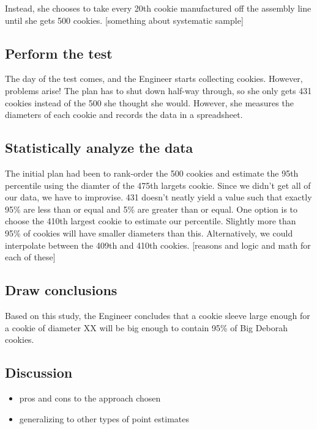 \documentclass[]{book}
\providecommand{\tightlist}{%
  \setlength{\itemsep}{0pt}\setlength{\parskip}{0pt}}
\theoremstyle{definition}
\theoremstyle{definition}
\theoremstyle{definition}
\theoremstyle{remark}
\begin{document}
Instead, she chooses to take every 20th cookie manufactured off the
assembly line until she gets 500 cookies. {[}something about systematic
sample{]}

\subsection{Perform the test}\label{perform-the-test}

The day of the test comes, and the Engineer starts collecting cookies.
However, problems arise! The plan has to shut down half-way through, so
she only gets 431 cookies instead of the 500 she thought she would.
However, she measures the diameters of each cookie and records the data
in a spreadsheet.

\subsection{Statistically analyze the
data}\label{statistically-analyze-the-data-2}

The initial plan had been to rank-order the 500 cookies and estimate the
95th percentile using the diamter of the 475th largets cookie. Since we
didn't get all of our data, we have to improvise. 431 doesn't neatly
yield a value such that exactly 95\% are less than or equal and 5\% are
greater than or equal. One option is to choose the 410th largest cookie
to estimate our percentile. Slightly more than 95\% of cookies will have
smaller diameters than this. Alternatively, we could interpolate between
the 409th and 410th cookies. {[}reasons and logic and math for each of
these{]}

\subsection{Draw conclusions}\label{draw-conclusions-2}

Based on this study, the Engineer concludes that a cookie sleeve large
enough for a cookie of diameter XX will be big enough to contain 95\% of
Big Deborah cookies.

\subsection{Discussion}\label{discussion}

\begin{itemize}
\tightlist
\item
  pros and cons to the approach chosen
\item
  generalizing to other types of point estimates
\end{itemize}
\end{document}
